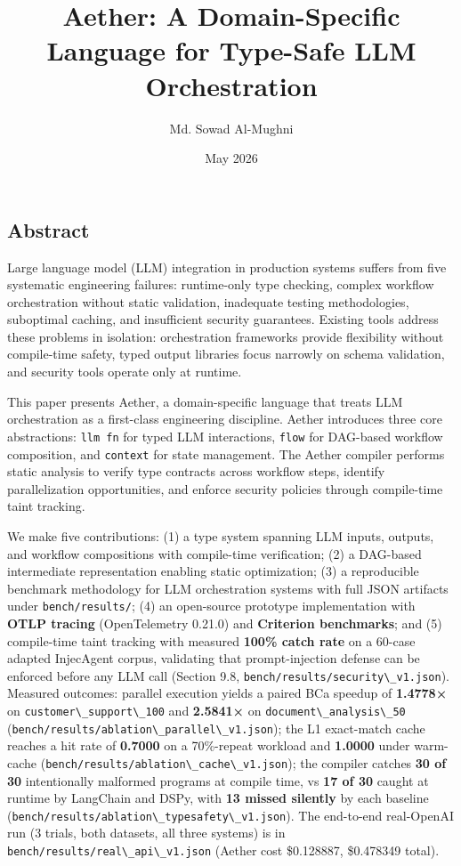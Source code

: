 \documentclass[
]{article}
\title{Aether: A Domain-Specific Language for Type-Safe LLM
Orchestration}
\author{Md. Sowad Al-Mughni}
\date{May 2026}
\newcommand{\passthrough}[1]{#1}
\begin{document}
\maketitle

\subsection{Abstract}\label{abstract}

Large language model (LLM) integration in production systems suffers
from five systematic engineering failures: runtime-only type checking,
complex workflow orchestration without static validation, inadequate
testing methodologies, suboptimal caching, and insufficient security
guarantees. Existing tools address these problems in isolation:
orchestration frameworks provide flexibility without compile-time
safety, typed output libraries focus narrowly on schema validation, and
security tools operate only at runtime.

This paper presents Aether, a domain-specific language that treats LLM
orchestration as a first-class engineering discipline. Aether introduces
three core abstractions: \passthrough{\lstinline!llm fn!} for typed LLM
interactions, \passthrough{\lstinline!flow!} for DAG-based workflow
composition, and \passthrough{\lstinline!context!} for state management.
The Aether compiler performs static analysis to verify type contracts
across workflow steps, identify parallelization opportunities, and
enforce security policies through compile-time taint tracking.

We make five contributions: (1) a type system spanning LLM inputs,
outputs, and workflow compositions with compile-time verification; (2) a
DAG-based intermediate representation enabling static optimization; (3)
a reproducible benchmark methodology for LLM orchestration systems with
full JSON artifacts under \passthrough{\lstinline!bench/results/!}; (4)
an open-source prototype implementation with \textbf{OTLP tracing}
(OpenTelemetry 0.21.0) and \textbf{Criterion benchmarks}; and (5)
compile-time taint tracking with measured \textbf{100\% catch rate} on a
60-case adapted InjecAgent corpus, validating that prompt-injection
defense can be enforced before any LLM call (Section 9.8,
\passthrough{\lstinline!bench/results/security\_v1.json!}). Measured
outcomes: parallel execution yields a paired BCa speedup of
\textbf{1.4778×} on \passthrough{\lstinline!customer\_support\_100!} and
\textbf{2.5841×} on \passthrough{\lstinline!document\_analysis\_50!}
(\passthrough{\lstinline!bench/results/ablation\_parallel\_v1.json!});
the L1 exact-match cache reaches a hit rate of \textbf{0.7000} on a
70\%-repeat workload and \textbf{1.0000} under warm-cache
(\passthrough{\lstinline!bench/results/ablation\_cache\_v1.json!}); the
compiler catches \textbf{30 of 30} intentionally malformed programs at
compile time, vs \textbf{17 of 30} caught at runtime by LangChain and
DSPy, with \textbf{13 missed silently} by each baseline
(\passthrough{\lstinline!bench/results/ablation\_typesafety\_v1.json!}).
The end-to-end real-OpenAI run (3 trials, both datasets, all three
systems) is in
\passthrough{\lstinline!bench/results/real\_api\_v1.json!} (Aether cost
\$0.128887, \$0.478349 total).
\end{document}
